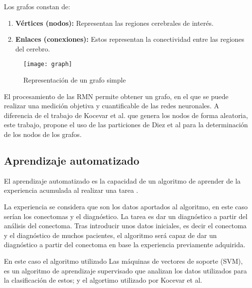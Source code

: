 \documentclass[fleqn,10pt]{UICArticle} %
\begin{document}
\vspace{5mm} 
Los grafos constan de:
\begin{enumerate}[noitemsep]
\item \textbf{Vértices (nodos):} Representan las regiones cerebrales de interés.
\item \textbf{Enlaces (conexiones):} Estos representan la conectividad entre las regiones del cerebro.
\end{enumerate}

\begin{figure}[ht]
	\centering
	\texttt{[image: graph]}
	\caption{Representación de un grafo simple}
	\label{fig:graph}
\end{figure}

El procesamiento de las RMN permite obtener un grafo, en el que se puede realizar una medición objetiva y cuantificable de las redes neuronales. A diferencia de el trabajo de Kocevar et al.\cite{Kocevar2016} que genera los nodos de forma aleatoria, este trabajo, propone el uso de las particiones de Diez et al \cite{Diez2015} para la determinación de los nodos de los grafos.


\subsection{Aprendizaje automatizado}

El aprendizaje automatizado es la capacidad de un algoritmo de aprender de la experiencia acumulada al realizar una tarea \cite{Friedman1997}.


La experiencia se considera que son los datos aportados al algoritmo, en este caso serían los conectomas y el diagnóstico. La tarea es dar un diagnóstico a partir del análisis del conectoma. Tras introducir unos datos iniciales, es decir el conectoma y el diagnóstico de muchos pacientes, el algoritmo será capaz de dar un diagnóstico a partir del conectoma en base la experiencia previamente adquirida.

En este caso el algoritmo utilizado Las máquinas de vectores de soporte (SVM), es un algoritmo de aprendizaje supervisado que analizan los datos utilizados para la clasificación de estos; y el algortimo utilizado por Kocevar et al.\cite{Kocevar2016}
\end{document}
